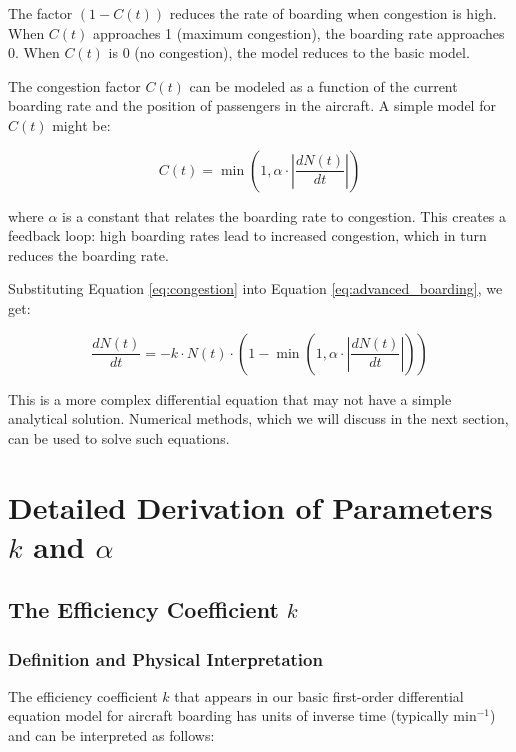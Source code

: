\documentclass[12pt,a4paper]{article}
\begin{document}
The factor $(1 - C(t))$ reduces the rate of boarding when congestion is high. When $C(t)$ approaches 1 (maximum congestion), the boarding rate approaches 0. When $C(t)$ is 0 (no congestion), the model reduces to the basic model.

The congestion factor $C(t)$ can be modeled as a function of the current boarding rate and the position of passengers in the aircraft. A simple model for $C(t)$ might be:

\begin{equation}
C(t) = \min\left(1, \alpha \cdot \left| \frac{dN(t)}{dt} \right| \right)
\label{eq:congestion}
\end{equation}

where $\alpha$ is a constant that relates the boarding rate to congestion. This creates a feedback loop: high boarding rates lead to increased congestion, which in turn reduces the boarding rate.

Substituting Equation \ref{eq:congestion} into Equation \ref{eq:advanced_boarding}, we get:

\begin{equation}
\frac{dN(t)}{dt} = -k \cdot N(t) \cdot \left(1 - \min\left(1, \alpha \cdot \left| \frac{dN(t)}{dt} \right| \right) \right)
\label{eq:combined_boarding}
\end{equation}

This is a more complex differential equation that may not have a simple analytical solution. Numerical methods, which we will discuss in the next section, can be used to solve such equations.

\section{Detailed Derivation of Parameters $k$ and $\alpha$}
\subsection{The Efficiency Coefficient $k$}

\subsubsection{Definition and Physical Interpretation}

The efficiency coefficient $k$ that appears in our basic first-order differential equation model for aircraft boarding has units of inverse time (typically $\text{min}^{-1}$) and can be interpreted as follows:
\end{document}
